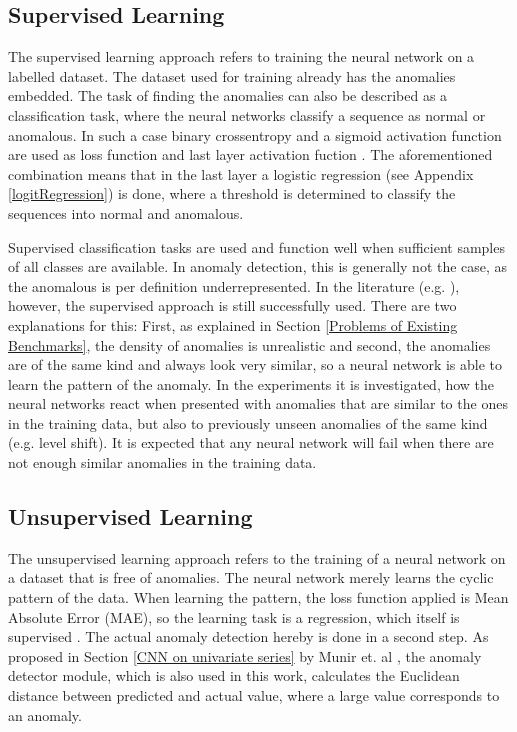 \subsection{Supervised Learning}
The supervised learning approach refers to training the neural network on a labelled dataset. The dataset used for training already has the anomalies embedded. The task of finding the anomalies can also be described as a classification task, where the neural networks classify a sequence as normal or anomalous. In such a case binary crossentropy and a sigmoid activation function are used as loss function and last layer activation fuction \parencite{Brownlee2019}. The aforementioned combination means that in the last layer a logistic regression (see Appendix \ref{logitRegression}) is done, where a threshold is determined to classify the sequences into normal and anomalous.

Supervised classification tasks are used and function well when sufficient samples of all classes are available. In anomaly detection, this is generally not the case, as the anomalous is per definition underrepresented. In the literature (e.g. \parencite{Wen2019}), however, the supervised approach is still successfully used. There are two explanations for this: First, as explained in Section \ref{Problems of Existing Benchmarks}, the density of anomalies is unrealistic and second, the anomalies are of the same kind and always look very similar, so a neural network is able to learn the pattern of the anomaly. In the experiments it is investigated, how the neural networks react when presented with anomalies that are similar to the ones in the training data, but also to previously unseen anomalies of the same kind (e.g. level shift). It is expected that any neural network will fail when there are not enough similar anomalies in the training data.

\subsection{Unsupervised Learning}
The unsupervised learning approach refers to the training of a neural network on a dataset that is free of anomalies. The neural network merely learns the cyclic pattern of the data. When learning the pattern, the loss function applied is Mean Absolute Error (MAE), so the learning task is a regression, which itself is supervised \parencite{Brownlee2019}. The actual anomaly detection hereby is done in a second step. As proposed in Section \ref{CNN on univariate series} by Munir et. al \parencite*{Munir2019}, the anomaly detector module, which is also used in this work, calculates the Euclidean distance between predicted and actual value, where a large value corresponds to an anomaly.

